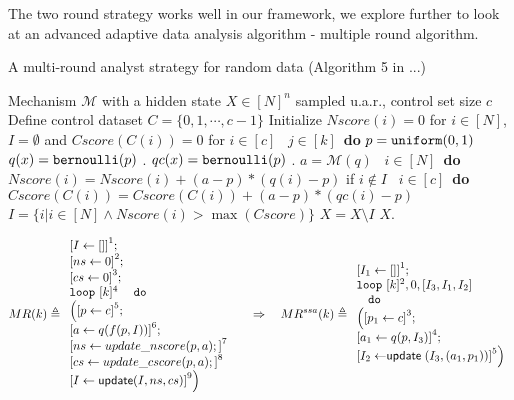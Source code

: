The two round strategy works well in our framework, we explore further to look at an advanced adaptive data analysis algorithm - multiple round algorithm.


\begin{example}
%
\begin{algorithm}
\footnotesize
\caption{A multi-round analyst strategy for random data (Algorithm 5 in ...)}
\label{alg:multiRound}
\begin{algorithmic}
\REQUIRE Mechanism $\mathcal{M}$ with a hidden state $X\in [N]^{n}$ sampled u.a.r., control set size $c$
\STATE Define control dataset $C = \{0,1, \cdots, c - 1\}$
\STATE Initialize $Nscore(i) = 0$ for $i \in [N]$, $I = \emptyset$ and $Cscore(C(i)) = 0$ for $i \in [c]$
\ $j\in [k]$\ {\bf do} 
\STATE {} $p=\mathtt{uniform}(0,1)$ 
\STATE {} $q (x) = \mathtt{bernoulli} ( p )$ .
\STATE {} $qc (x) = \mathtt{bernoulli} ( p )$ .
\STATE {} $a = \mathcal{M}(q)$ 
\STATE {}\ $i \in [N]$\ {\bf do}
\STATE \qquad \qquad $Nscore(i) = Nscore(i) + (a - p)*(q (i) - p)$ if $i \notin I$
\STATE {}\ $i \in [c]$\ {\bf do}
\STATE \qquad \qquad $Cscore(C(i)) = Cscore(C(i)) + (a - p)*(qc (i) - p)$
\STATE {} $I = \{i | i\in [N] \land Nscore(i) > \max(Cscore)\}$
\STATE {} $X = X \setminus I$ 
\RETURN $X$.
\end{algorithmic}
\end{algorithm}
%
\[
MR(k) \triangleq
\begin{array}{l}
    \clabel{I \leftarrow [] }^1; \\
    \clabel{\assign{ns}{0} }^{2}; \\
     \clabel{\assign{cs}{0} }^{3}; \\
    \eloop ~ [k]^{4} ~  
    \ ~ \edo ~ \\ \Big(
    \clabel{p \leftarrow c }^{5} ; \\
    \clabel{a \leftarrow q(f(p, I)) }^{6}; \\
    \clabel{\assign{ns}{update\_nscore(p, a)}; }^{7}\\
    \clabel{\assign{cs}{update\_cscore(p, a)}; }^{8}\\
    \clabel{I \leftarrow \mathsf{update} ( I, ns, cs)  }^{9}
    \Big) 
\end{array}
%
~~~~ \Rightarrow ~~~
%
MR^{ssa}(k) \triangleq
\begin{array}{l}
    \left[I_1 \leftarrow [] \right]^1; \\
    \eloop ~ [k]^{2} , 0, [I_3,I_1,I_2] \\ 
    \ ~ \edo ~ \\ \Big(
    \left[p_1 \leftarrow c \right]^3 ; \\
    \left[ a_1 \leftarrow q (p, I_3) \right]^4;\\
    \left[I_2 \leftarrow \mathrel{\mathsf{update}} ( {I_3}, (a_1, p_1))  \right]^5
    \Big) 
\end{array}
\]
\end{example}
